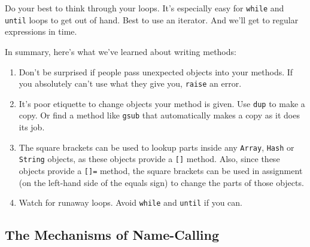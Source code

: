 \documentclass[10pt,twoside]{report}
\begin{document}
Do your best to think through your loops.  It's especially easy for
\lstinline[breaklines=true]|while| and
\lstinline[breaklines=true]|until| loops to get out of hand.  Best to
use an iterator.  And we'll get to regular expressions in time.

In summary, here's what we've learned about writing methods:

\begin{enumerate}
\item Don't be surprised if people pass unexpected objects into your
  methods. If you absolutely can't use what they give you,
  \lstinline[breaklines=true]|raise| an error.
\item It's poor etiquette to change objects your method is given.  Use
  \lstinline[breaklines=true]|dup| to make a copy.  Or find a method
  like \lstinline[breaklines=true]|gsub| that automatically makes a
  copy as it does its job.
\item The square brackets can be used to lookup parts inside any
  \lstinline[breaklines=true]|Array|,
  \lstinline[breaklines=true]|Hash| or
  \lstinline[breaklines=true]|String| objects, as these objects
  provide a \lstinline[breaklines=true]|[]| method.  Also, since these
  objects provide a \lstinline[breaklines=true]|[]=| method, the
  square brackets can be used in assignment (on the left-hand side of
  the equals sign) to change the parts of those objects.
\item Watch for runaway loops.  Avoid
  \lstinline[breaklines=true]|while| and
  \lstinline[breaklines=true]|until| if you can.
\end{enumerate}

\newpage



\subsection{The Mechanisms of Name-Calling}



\end{document}
